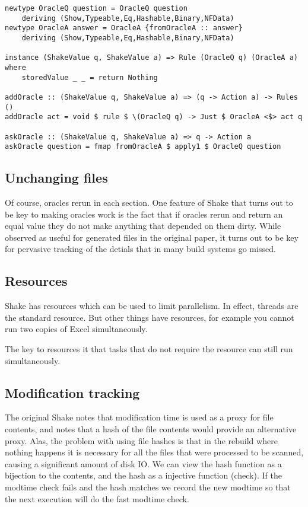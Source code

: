 \begin{lstlisting}
newtype OracleQ question = OracleQ question
    deriving (Show,Typeable,Eq,Hashable,Binary,NFData)
newtype OracleA answer = OracleA {fromOracleA :: answer}
    deriving (Show,Typeable,Eq,Hashable,Binary,NFData)

instance (ShakeValue q, ShakeValue a) => Rule (OracleQ q) (OracleA a) where
    storedValue _ _ = return Nothing

addOracle :: (ShakeValue q, ShakeValue a) => (q -> Action a) -> Rules ()
addOracle act = void $ rule $ \(OracleQ q) -> Just $ OracleA <$> act q

askOracle :: (ShakeValue q, ShakeValue a) => q -> Action a
askOracle question = fmap fromOracleA $ apply1 $ OracleQ question
\end{lstlisting}

\subsection{Unchanging files}

Of course, oracles rerun in each section. One feature of Shake that turns out to be key to making oracles work is the fact that if oracles rerun and return an equal value they do not make anything that depended on them dirty. While observed as useful for generated files in the original paper, it turns out to be key for pervasive tracking of the detials that in many build systems go missed.

\subsection{Resources}

Shake has resources which can be used to limit parallelism. In effect, threads are the standard resource. But other things have resources, for example you cannot run two copies of Excel simultaneously.

The key to resources it that tasks that do not require the resource can still run simultaneously.

\subsection{Modification tracking}

The original Shake notes that modification time is used as a proxy for file contents, and notes that a hash of the file contents would provide an alternative proxy. Alas, the problem with using file hashes is that in the rebuild where nothing happens it is necessary for all the files that were processed to be scanned, causing a significant amount of disk IO. We can view the hash function as a bijection to the contents, and the hash as a injective function (check). If the modtime check fails and the hash matches we record the new modtime so that the next execution will do the fast modtime check.

